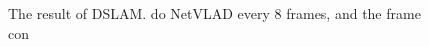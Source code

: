 \begin{figure}[thb]
    \begin{minipage}[t]{0.475\linewidth}  
    \centering
    \end{minipage}
    \begin{minipage}[t]{0.475\linewidth}  
    \centering  
    \end{minipage}
    \caption{The result of DSLAM.  do NetVLAD every 8 frames, and the frame con
    }
\label{fig:dslamresult}
\end{figure}



